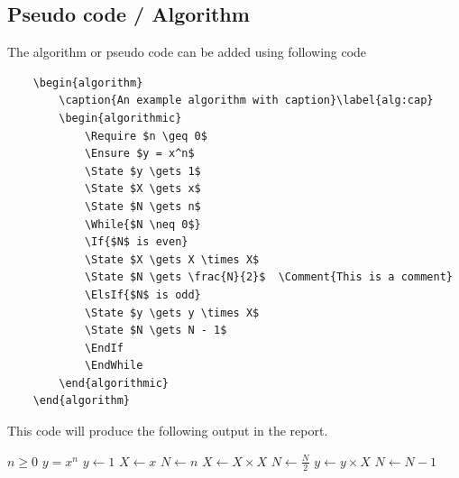 \subsection{Pseudo code / Algorithm}
The algorithm or pseudo code can be added using following code
\begin{verbatim}
	\begin{algorithm}
		\caption{An example algorithm with caption}\label{alg:cap}
		\begin{algorithmic}
			\Require $n \geq 0$
			\Ensure $y = x^n$
			\State $y \gets 1$
			\State $X \gets x$
			\State $N \gets n$
			\While{$N \neq 0$}
			\If{$N$ is even}
			\State $X \gets X \times X$
			\State $N \gets \frac{N}{2}$  \Comment{This is a comment}
			\ElsIf{$N$ is odd}
			\State $y \gets y \times X$
			\State $N \gets N - 1$
			\EndIf
			\EndWhile
		\end{algorithmic}
	\end{algorithm}
\end{verbatim}
This code will produce the following output in the report.
\begin{algorithm}
	\caption{An example algorithm with caption}\label{alg:cap}
	\begin{algorithmic}
		\Require $n \geq 0$
		\Ensure $y = x^n$
		\State $y \gets 1$
		\State $X \gets x$
		\State $N \gets n$
		\State $X \gets X \times X$
		\State $N \gets \frac{N}{2}$  
		\State $y \gets y \times X$
		\State $N \gets N - 1$
		\EndIf
		\EndWhile
	\end{algorithmic}
\end{algorithm}
